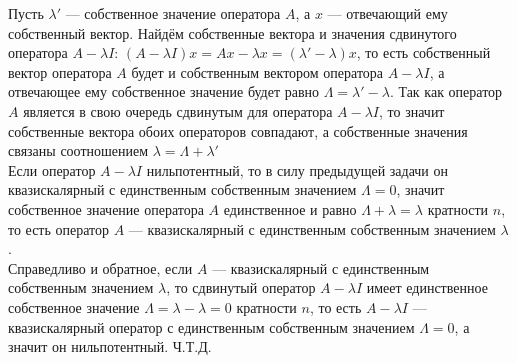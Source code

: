 \documentclass[12pt]{article} %
\begin{document}
\begin{enumerate}
    Пусть $\lambda'$ --- собственное значение оператора $A$, а $x$ --- отвечающий ему собственный вектор. Найдём собственные вектора и значения сдвинутого оператора $A - \lambda I$: $(A - \lambda I) x = Ax - \lambda x = (\lambda' - \lambda)x$, то есть собственный вектор оператора $A$ будет и собственным вектором оператора $A - \lambda I$, а отвечающее ему собственное значение будет равно $\Lambda =  \lambda' - \lambda$. Так как оператор $A$ является в свою очередь сдвинутым для оператора $A - \lambda I$, то значит собственные вектора обоих операторов совпадают, а собственные значения связаны соотношением $\lambda = \Lambda + \lambda'$\\

    Если оператор $A - \lambda I$ нильпотентный, то в силу предыдущей задачи он квазискалярный с единственным собственным значением $\Lambda = 0$, значит собственное значение оператора $A$ единственное и равно $\Lambda + \lambda = \lambda$ кратности $n$, то есть оператор $A$ --- квазискалярный с единственным собственным значением $\lambda$.\\

    Справедливо и обратное, если $A$ --- квазискалярный с единственным собственным значением $\lambda$, то сдвинутый оператор $A - \lambda I$ имеет единственное собственное значение $\Lambda = \lambda - \lambda = 0$ кратности $n$, то есть  $A - \lambda I$ --- квазискалярный оператор с единственным собственным значением $\Lambda = 0$, а значит он нильпотентный. Ч.Т.Д.
    

\end{enumerate}
\end{document}
